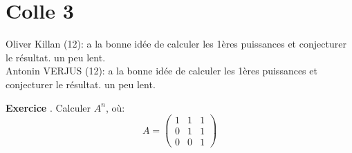 \documentclass[10pt,a4paper]{article}
\newcounter{question}
\newcounter{exo}
\newenvironment{exo}{\vspace{0.5cm}\setcounter{question}{0}\addtocounter{exo}{1} \noindent \textbf{Exercice \theexo}. \normalsize }{\par}
\begin{document}
	\section*{Colle 3}
	\setcounter{exo}{0}
	Oliver Killan (12): a la bonne idée de calculer les 1ères puissances et conjecturer le résultat. un peu lent.\\
	Antonin VERJUS (12): a la bonne idée de calculer les 1ères puissances et conjecturer le résultat. un peu lent.\\
		
	\begin{exo}
		Calculer $A^n$, où:
		$$A = \begin{pmatrix}
		1 & 1 & 1 \\ 
		0 & 1 & 1 \\ 
		0 & 0 & 1
		\end{pmatrix}$$
	\end{exo}
\end{document}
